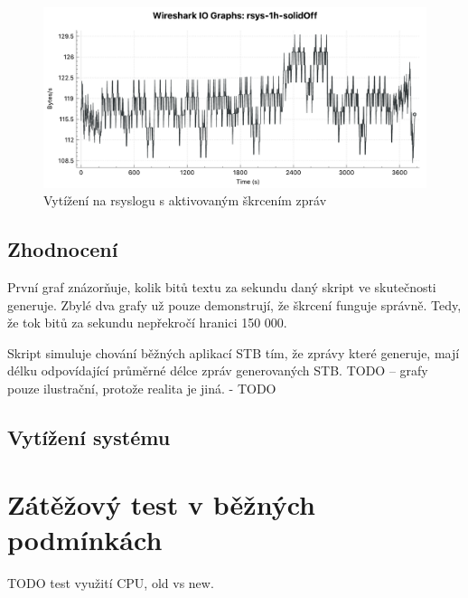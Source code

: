 \documentclass[thesis=B,czech]{FITthesis}[2012/06/26]
\begin{document}
\begin{figure}[H]
	\centering
	\includegraphics[scale=0.44]{images/test-1h-rsys-solidoff}
	\caption[Vytížení na rsyslogu s aktivovaným škrcením zpráv]{Vytížení na rsyslogu s aktivovaným škrcením zpráv}
\end{figure}


\subsection*{Zhodnocení}
První graf znázorňuje, kolik bitů textu za sekundu daný skript ve skutečnosti generuje.
Zbylé dva grafy už pouze demonstrují, že škrcení funguje správně. Tedy, že tok bitů za sekundu nepřekročí hranici 150 000.

Skript simuluje chování běžných aplikací STB tím, že zprávy které generuje, mají délku odpovídající průměrné délce zpráv generovaných STB.
TODO -- grafy pouze ilustrační, protože realita je jiná. - TODO

\subsection{Vytížení systému}

\section{Zátěžový test v běžných podmínkách}
TODO test využití CPU, old vs new.


\begin{conclusion}

\end{conclusion}




\appendix
\end{document}
